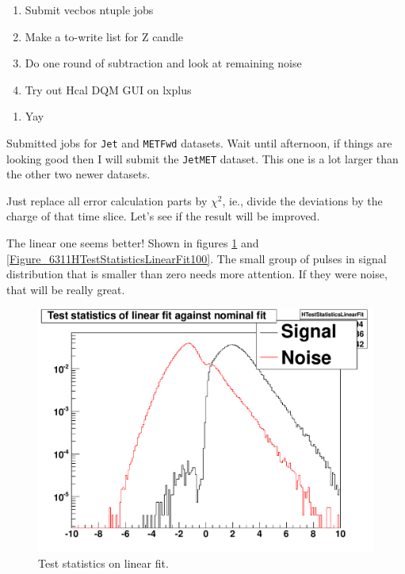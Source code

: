 

\begin{enumerate}
\item Submit vecbos ntuple jobs
\item Make a to-write list for Z candle
\item Do one round of subtraction and look at remaining noise
\item Try out Hcal DQM GUI on lxplus
\end{enumerate}


\begin{enumerate}
\item Yay
\end{enumerate}


Submitted jobs for \texttt{Jet} and \texttt{METFwd} datasets.  Wait until afternoon, if things are looking good then I will submit the \texttt{JetMET} dataset.
This one is a lot larger than the other two newer datasets.


Just replace all error calculation parts by $\chi^2$, ie., divide the deviations by the charge of that time slice.  Let's see if the result will be improved.

The linear one seems better!  Shown in figures \ref{Figure_6311HTestStatisticsLinearFit} and \ref{Figure_6311HTestStatisticsLinearFit100}.
The small group of pulses in signal distribution that is smaller than zero needs more attention.  If they were noise, that will be really great.

\begin{figure}
\includegraphics[width=120mm]{DailyLog/6311/6311HTestStatisticsLinearFit.pdf}
\caption{Test statistics on linear fit.}
\label{Figure_6311HTestStatisticsLinearFit}
\end{figure}

